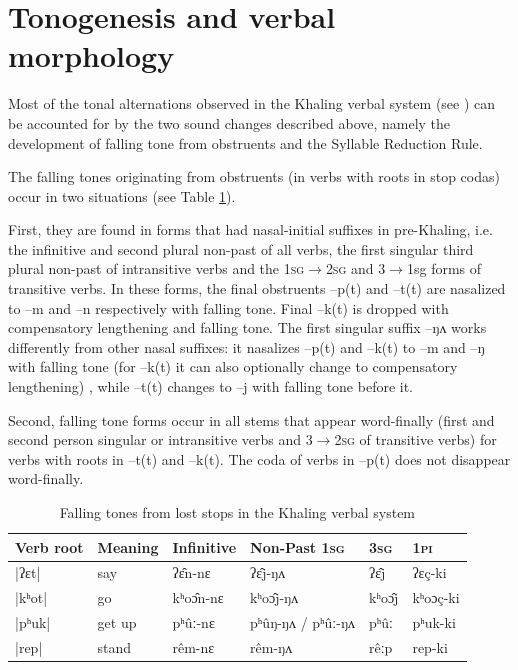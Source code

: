 \documentclass[oldfontcommands,oneside,a4paper,11pt]{article}
\newcommand{\ipa}[1]{{\phon \mbox{#1}}} %
\begin{document}
\section{Tonogenesis and verbal morphology} \label{sec:tonogenesis.verb}
Most of the tonal alternations observed in the Khaling verbal system (see \citealt{jacques12khaling}) can be accounted for by the two sound changes described above, namely the development of falling tone from obstruents and the Syllable Reduction Rule.

 The falling tones originating from obstruents (in verbs with roots in stop codas) occur in two situations (see Table \ref{tab:falling.verb}).
 
 First, they are found  in forms that had nasal-initial suffixes in pre-Khaling, i.e. the infinitive and second plural non-past of all verbs, the first singular third plural non-past of intransitive verbs  and the   \textsc{1sg$\rightarrow$2sg} and {3$\rightarrow$1sg} forms of transitive verbs. In these forms, the final obstruents \ipa{--p(t)} and  \ipa{--t(t)} are nasalized to \ipa{--m} and \ipa{--n} respectively with falling tone. Final \ipa{--k(t)} is dropped with compensatory lengthening and falling tone. The first singular suffix \ipa{--ŋʌ} works differently from other nasal suffixes:  it nasalizes \ipa{--p(t)} and   \ipa{--k(t)} to \ipa{--m} and \ipa{--ŋ} with falling tone (for  \ipa{--k(t)}  it can also optionally change to compensatory lengthening) , while \ipa{--t(t)} changes to \ipa{--j} with falling tone before it.
 
 Second, falling tone forms occur in all stems that appear word-finally (first and second person singular or intransitive verbs and \textsc{3$\rightarrow$2sg} of transitive verbs) for verbs with roots in \ipa{--t(t)} and   \ipa{--k(t)}. The coda of verbs in \ipa{--p(t)} does not disappear word-finally.

\begin{table}[H]
\caption{Falling tones from lost stops in the Khaling verbal system} \centering \label{tab:falling.verb}
\begin{tabular}{llllll}
\toprule
Verb root	&Meaning	&Infinitive  & Non-Past \textsc{1sg} &  \textsc{3sg} &  \textsc{1pi}\\
\midrule
|ʔɛt|	&	say			&\ipa{ʔɛ̂n-nɛ}		&\ipa{ʔɛ̂j-ŋʌ}	&\ipa{ʔɛ̂j} &\ipa{ʔɛç-ki} \\
|kʰot|	&	go		&\ipa{kʰoɔ̂n-nɛ}		&\ipa{kʰoɔ̂j-ŋʌ}&\ipa{kʰoɔ̂j} &\ipa{kʰoɔç-ki} \\
|pʰuk|	&	get up			&\ipa{pʰûː-nɛ}&\ipa{pʰûŋ-ŋʌ} / \ipa{pʰûː-ŋʌ}	&\ipa{pʰûː} &\ipa{pʰuk-ki} \\
|rep|	&	stand		&\ipa{rêm-nɛ}		&\ipa{rêm-ŋʌ}&\ipa{rêːp} &\ipa{rep-ki} \\
\bottomrule
\end{tabular}
\end{table}
\end{document}

